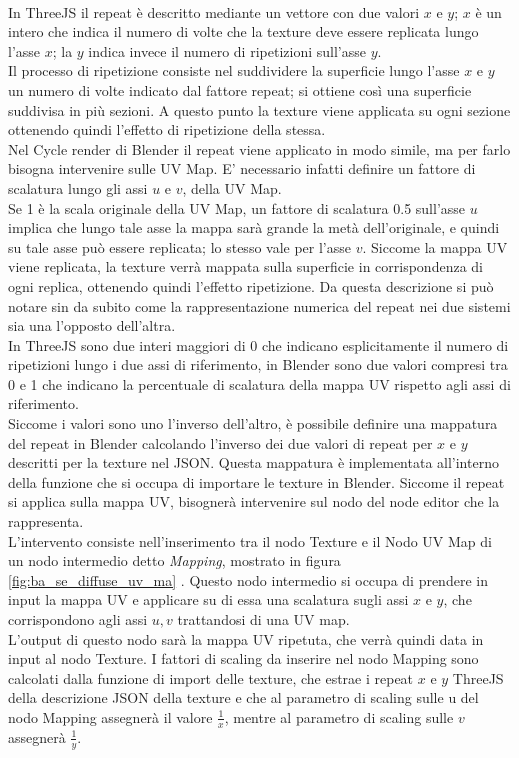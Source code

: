 \\
In ThreeJS il repeat è descritto mediante un vettore con due valori $x$ e $y$; $x$ è un intero che indica il numero di volte che la texture deve essere replicata lungo l’asse $x$; la $y$ indica invece il numero di ripetizioni sull’asse $y$. 
\\
Il processo di ripetizione consiste nel suddividere la superficie lungo l’asse $x$ e $y$ un numero di volte indicato dal fattore repeat; si ottiene così una superficie suddivisa in più sezioni. A questo punto la texture viene applicata su ogni sezione ottenendo quindi l’effetto di ripetizione della stessa.
\\
Nel Cycle render di Blender il repeat viene applicato in modo simile, ma per farlo  bisogna intervenire sulle UV Map. E’ necessario infatti definire un fattore di scalatura lungo gli assi $u$ e $v$, della UV Map. 
\\
Se 1 è la scala originale della UV Map, un fattore di scalatura 0.5 sull’asse $u$ implica che lungo tale asse la mappa sarà grande la metà dell’originale, e quindi su tale asse può essere replicata; lo stesso vale per l’asse $v$. Siccome la mappa UV viene replicata, la texture verrà mappata sulla superficie in corrispondenza di ogni replica, ottenendo quindi l’effetto ripetizione. Da questa descrizione si può notare sin da subito come la rappresentazione numerica del repeat nei due sistemi sia una l’opposto dell’altra. 
\\
In ThreeJS sono due interi maggiori di 0 che indicano esplicitamente il numero di ripetizioni lungo i due assi di riferimento, in Blender sono due valori compresi tra 0 e 1 che indicano la percentuale di scalatura della mappa UV rispetto agli assi di riferimento. 
\\
Siccome i valori sono uno l’inverso dell’altro, è possibile definire una mappatura del repeat in Blender calcolando l’inverso dei due valori di repeat per $x$ e $y$ descritti per la texture nel JSON. Questa mappatura è implementata all’interno della funzione che si occupa di importare le texture in Blender. Siccome il repeat si applica sulla mappa UV, bisognerà intervenire sul nodo del node editor che la rappresenta. 
\\
L’intervento consiste nell’inserimento tra il nodo Texture e il Nodo UV Map di un nodo intermedio detto \emph{Mapping}, mostrato in figura \ref{fig:ba_se_diffuse_uv_ma} . Questo nodo intermedio si occupa di prendere in input la mappa UV e applicare su di essa una scalatura sugli assi $x$ e $y$, che corrispondono agli assi $u,v$ trattandosi di una UV map. 
\\
L’output di questo nodo sarà la mappa UV ripetuta, che verrà quindi data in input al nodo Texture. I fattori di scaling da inserire nel nodo Mapping sono calcolati dalla funzione di import delle texture, che estrae i repeat $x$ e $y$ ThreeJS della descrizione JSON della texture e che al parametro di scaling sulle u del nodo Mapping assegnerà il valore $\frac{1}{x}$, mentre al parametro di scaling sulle $v$ assegnerà $\frac{1}{y}$.
\\

